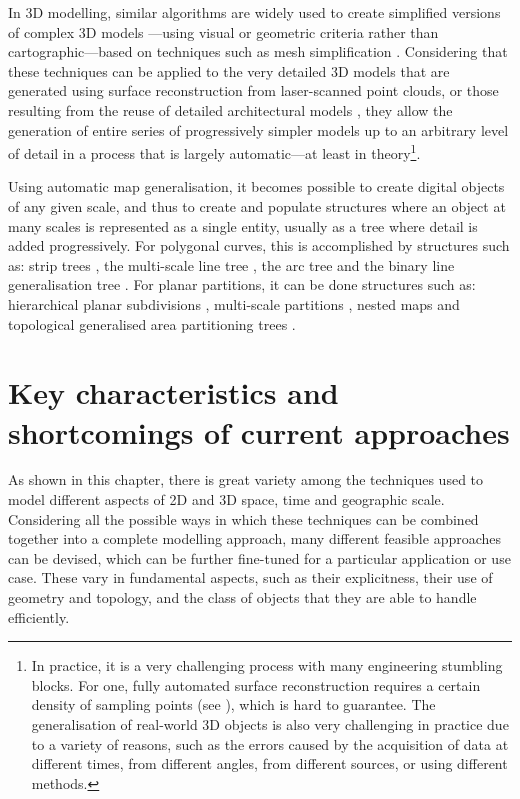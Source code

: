 In 3D modelling, similar algorithms are widely used to create simplified versions of complex 3D models \citep{Meng07,Kada07,Zhu09,Zhao12}---using visual or geometric criteria rather than cartographic---based on techniques such as mesh simplification \citep{Garland97,Lindstrom98}.
Considering that these techniques can be applied to the very detailed 3D models that are generated using surface reconstruction \citep{Amenta98,Kazhdan06} from laser-scanned point clouds, or those resulting from the reuse of detailed architectural models \citep{Geiger15}, they allow the generation of entire series of progressively simpler models up to an arbitrary level of detail in a process that is largely automatic---at least in theory\footnote{In practice, it is a very challenging process with many engineering stumbling blocks.
For one, fully automated surface reconstruction requires a certain density of sampling points (see \citet[Ch.~13]{Cheng12}), which is hard to guarantee.
The generalisation of real-world 3D objects is also very challenging in practice due to a variety of reasons, such as the errors caused by the acquisition of data at different times, from different angles, from different sources, or using different methods.}.

Using automatic map generalisation, it becomes possible to create digital objects of any given scale, and thus to create and populate structures where an object at many scales is represented as a single entity, usually as a tree where detail is added progressively.
For polygonal curves, this is accomplished by structures such as: strip trees \citep{Ballard81}, the multi-scale line tree \citep{Jones86}, the arc tree \citep{Gunther88} and the binary line generalisation tree \citep{vanOosterom90}.
For planar partitions, it can be done structures such as: hierarchical planar subdivisions \citep{Filho95}, multi-scale partitions \citep{Rigaux95}, nested maps \citep{Plumer97} and topological generalised area partitioning trees \citep{vanOosterom05}.

\section{Key characteristics and shortcomings of current approaches}
\label{se:modelling-conclusions}

As shown in this chapter, there is great variety among the techniques used to model different aspects of 2D and 3D space, time and geographic scale.
Considering all the possible ways in which these techniques can be combined together into a complete modelling approach, many different feasible approaches can be devised, which can be further fine-tuned for a particular application or use case.
These vary in fundamental aspects, such as their explicitness, their use of geometry and topology, and the class of objects that they are able to handle efficiently.

